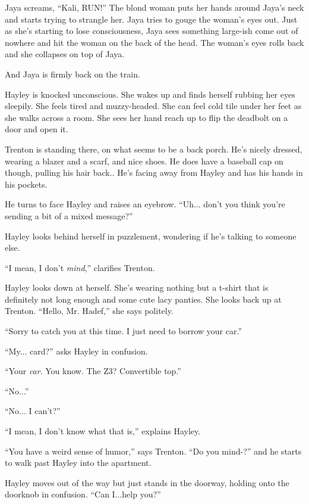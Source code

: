 Jaya screams, ``Kali, RUN!''  The blond woman puts her hands around Jaya's neck and starts trying to strangle her.  Jaya tries to gouge the woman's eyes out.  Just as she's starting to lose consciousness, Jaya sees something large-ish come out of nowhere and hit the woman on the back of the head.   The woman's eyes rolls back and she collapses on top of Jaya.



And Jaya is firmly back on the train.



Hayley is knocked unconscious.  She wakes up and finds herself rubbing her eyes sleepily.  She feels tired and muzzy-headed.  She can feel cold tile under her feet as she walks across a room.  She sees her hand reach up to flip the deadbolt on a door and open it. 



Trenton is standing there, on what seems to be a back porch.  He's nicely dressed, wearing a blazer and a scarf, and nice shoes.  He does have a baseball cap on though, pulling his hair back..  He's facing away from Hayley and has his hands in his pockets.



He turns to face Hayley and raises an eyebrow.  ``Uh... don't you think you're sending a bit of a mixed message?''

Hayley looks behind herself in puzzlement, wondering if he's talking to someone else.

``I mean, I don't \textit{mind},'' clarifies Trenton.

Hayley looks down at herself.  She's wearing nothing but a t-shirt that is definitely not long enough and some cute lacy panties.  She looks back up at Trenton.  ``Hello, Mr. Hadef,'' she says politely.

``Sorry to catch you at this time.  I just need to borrow your car.''

``My... card?'' asks Hayley in confusion.

``Your \textit{car}.  You know. The Z3?  Convertible top.''

``No...''

``No... I can't?''

``I mean, I don't know what that is,'' explains Hayley.

``You have a weird sense of humor,'' says Trenton.  ``Do you mind-?'' and he starts to walk past Hayley into the apartment. 

Hayley moves out of the way but just stands in the doorway, holding onto the doorknob in confusion.  ``Can I...help you?''

